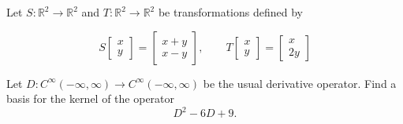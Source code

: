 \documentclass[11pt]{exam}
\newcommand{\R}{\mathbb{R}}
\begin{document}
\begin{questions}

\addpoints
\question
Let $S: \R^2 \rightarrow \R^2$ and $T:\R^2 \rightarrow \R^2$ 
be transformations defined by

$$ S \begin{bmatrix} x \\ y \end{bmatrix} = \begin{bmatrix}
x+y \\ x-y \end{bmatrix},
\quad  \quad T \begin{bmatrix} x \\ y \end{bmatrix} = \begin{bmatrix}
x \\ 2y \end{bmatrix}$$


\vfill

\newpage
\addpoints
\question[20]





 Let $D : C^{\infty}(-\infty,\infty) \rightarrow C^{\infty}(-\infty,\infty)$ be the usual derivative operator. Find a basis for the kernel of the operator
$$D^2-6D+9.$$


\end{questions}
\end{document}
